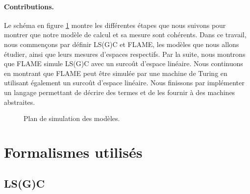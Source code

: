 \documentclass[a4paper, 11pt]{article}
\theoremstyle{definition}
\begin{document}
\paragraph{Contributions.}
Le schéma en figure \ref{plan} montre les différentes étapes que nous suivons pour montrer que notre modèle de calcul et sa mesure sont cohérents.
Dans ce travail, nous commençons par définir LS(G)C et FLAME, les modèles que nous allons étudier, ainsi que leurs mesures d'espaces respectifs.
Par la suite, nous montrons que FLAME simule LS(G)C avec un surcoût d'espace linéaire.
Nous continuons en montrant que FLAME peut être simulée par une machine de Turing en utilisant également un surcoût d'espace linéaire.
Nous finissons par implémenter un langage permettant de décrire des termes et de les fournir à des machines abstraites.
  \begin{figure}
    \centering
\label{plan}
\caption{Plan de simulation des modèles.}
  \end{figure}

\section{Formalismes utilisés}
\subsection{LS(G)C}
\label{def:lsgc}
\end{document}
